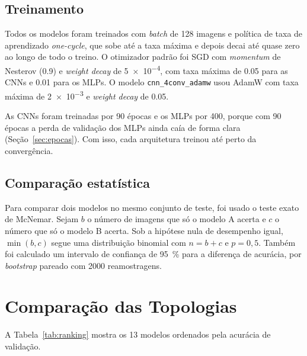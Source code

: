 \documentclass[11pt,a4paper]{article}
\newcommand{\code}[1]{\texttt{#1}}
\begin{document}
\subsection*{Treinamento}

Todos os modelos foram treinados com \textit{batch} de 128 imagens e política de taxa de aprendizado \textit{one-cycle}, que sobe até a taxa máxima e depois decai até quase zero ao longo de todo o treino. O otimizador padrão foi SGD com \textit{momentum} de Nesterov (\num{0,9}) e \textit{weight decay} de \num{5e-4}, com taxa máxima de \num{0,05} para as CNNs e \num{0,01} para os MLPs. O modelo \code{cnn\_4conv\_adamw} usou AdamW com taxa máxima de \num{2e-3} e \textit{weight decay} de \num{0,05}.

As CNNs foram treinadas por 90 épocas e os MLPs por 400, porque com 90 épocas a perda de validação dos MLPs ainda caía de forma clara (Seção~\ref{sec:epocas}). Com isso, cada arquitetura treinou até perto da convergência.

\subsection*{Comparação estatística}

Para comparar dois modelos no mesmo conjunto de teste, foi usado o teste exato de McNemar. Sejam $b$ o número de imagens que só o modelo A acerta e $c$ o número que só o modelo B acerta. Sob a hipótese nula de desempenho igual, $\min(b,c)$ segue uma distribuição binomial com $n=b+c$ e $p=0{,}5$. Também foi calculado um intervalo de confiança de \SI{95}{\percent} para a diferença de acurácia, por \textit{bootstrap} pareado com \num{2000} reamostragens.

\section{Comparação das Topologias}

A Tabela~\ref{tab:ranking} mostra os 13 modelos ordenados pela acurácia de validação.
\end{document}
